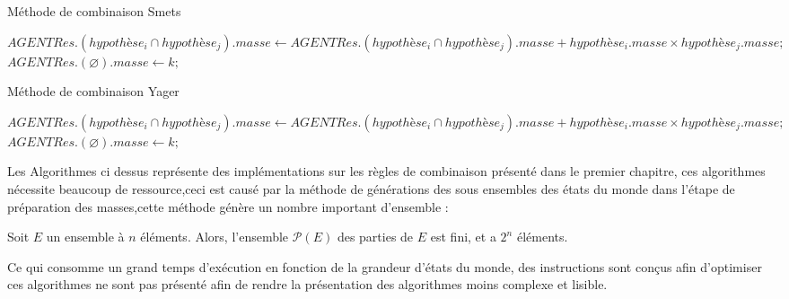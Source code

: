 \vspace{3em}
\begin{algorithm}[H]
\setcounter{AlgoLine}{3}
\caption{Méthode de combinaison Smets}

$AGENTRes.(hypothèse_{i} \cap hypothèse_{j}).masse \gets AGENTRes.(hypothèse_{i} \cap hypothèse_{j}).masse + hypothèse_{i}.masse \times hypothèse_{j}.masse ;$
$AGENTRes.(\varnothing ).masse \gets k;$
\end{algorithm}
\vspace{3em}
\begin{algorithm}[H]
\setcounter{AlgoLine}{9}
\caption{Méthode de combinaison Yager}
$AGENTRes.(hypothèse_{i} \cap hypothèse_{j}).masse \gets AGENTRes.(hypothèse_{i} \cap hypothèse_{j}).masse + hypothèse_{i}.masse \times hypothèse_{j}.masse ;$
$AGENTRes.(\varnothing ).masse \gets k;$
\end{algorithm}
\vspace{3em}
Les Algorithmes ci dessus représente des implémentations sur les règles de combinaison présenté dans le premier chapitre, ces algorithmes nécessite beaucoup de ressource,ceci est causé par la méthode de générations des sous ensembles des états du monde dans l'étape de préparation des masses,cette méthode génère un nombre important d'ensemble :

Soit $E$ un ensemble à $n$ éléments. Alors, l'ensemble $\mathcal{P}(E)$ des parties de $E$ est fini, et a \textbf{$2^n$} éléments.

\vspace{4em}
Ce qui consomme un grand temps d'exécution en fonction de la grandeur d'états du monde, des instructions sont conçus afin  d'optimiser ces algorithmes ne sont pas présenté afin de rendre la présentation des algorithmes moins complexe et lisible.

